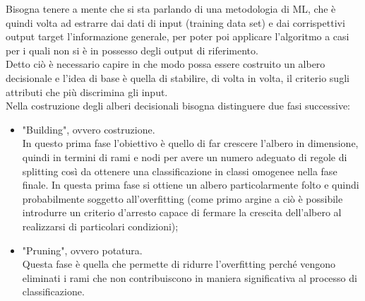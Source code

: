 Bisogna tenere a mente che si sta parlando di una metodologia di ML, che è quindi volta ad estrarre dai dati di input (training data set) e dai corrispettivi output target l'informazione generale, per poter poi applicare l'algoritmo a casi per i quali non si è in possesso degli output di riferimento.\\
Detto ciò è necessario capire in che modo possa essere costruito un albero decisionale e l'idea di base è quella di stabilire, di volta in volta, il criterio sugli attributi che più discrimina gli input. \\
Nella costruzione degli alberi decisionali bisogna distinguere due fasi successive:
\begin{itemize}
	\item "Building", ovvero costruzione.\\
	In questo prima fase l'obiettivo è quello di far crescere l'albero in dimensione, quindi in termini di rami e nodi per avere un numero adeguato di regole di splitting così da ottenere una classificazione in classi omogenee nella fase finale. In questa prima fase si ottiene un albero particolarmente folto e quindi probabilmente soggetto all'overfitting (come primo argine a ciò è possibile introdurre un criterio d'arresto capace di fermare la crescita dell'albero al realizzarsi di particolari condizioni);
	\item "Pruning", ovvero potatura.\\
	Questa fase è quella che permette di ridurre l'overfitting perché vengono eliminati i rami che non contribuiscono in maniera significativa al processo di classificazione.
	
\end{itemize} 

